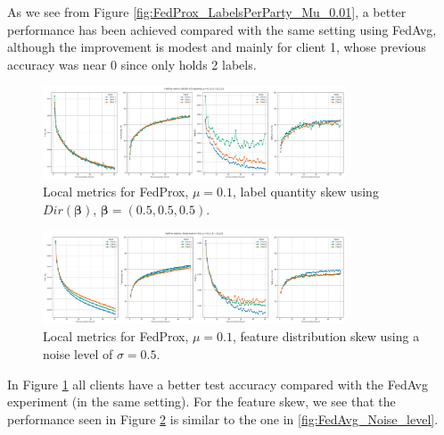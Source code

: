 As we see from Figure \ref{fig:FedProx_LabelsPerParty_Mu_0.01}, a better performance has been achieved compared with the same setting using FedAvg, although the improvement is modest and mainly for client 1, whose previous accuracy was near 0 since only holds 2 labels.

\begin{figure}[H]
  \centering
  \includegraphics[width=0.8\textwidth]{figures/2-Federated_Learning/FedProx_QuantitySkew_Dir_05_Mu_0.1.png}
  \caption{Local metrics for FedProx, $\mu = 0.1$, label quantity skew using $Dir(\boldsymbol{\beta})$, $\boldsymbol{\beta} = (0.5,0.5,0.5)$.}
  \label{fig:FedProx_LabelsQuantitySkew_Dir_05_Mu_0.1}
\end{figure}

\begin{figure}[H]
  \centering
  \includegraphics[width=0.8\textwidth]{figures/2-Federated_Learning/FedProx_NoiseLevel_Mu_0.1.png}
  \caption{Local metrics for FedProx, $\mu = 0.1$, feature distribution skew using a noise level of $\sigma = 0.5$.}
  \label{fig:FedProx_Noise_Dir_05_Mu_0.1}
\end{figure}

In Figure \ref{fig:FedProx_LabelsQuantitySkew_Dir_05_Mu_0.1} all clients have a better test accuracy compared with the FedAvg experiment (in the same setting). For the feature skew, we see that the performance seen in Figure \ref{fig:FedProx_Noise_Dir_05_Mu_0.1} is similar to the one in \ref{fig:FedAvg_Noise_level}.

